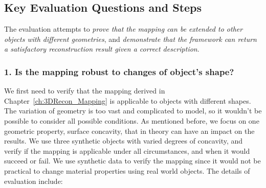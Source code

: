 

\subsection{Key Evaluation Questions and Steps}

The evaluation attempts to \textit{prove that the mapping can be extended to other objects with different geometries}, and \textit{demonstrate that the framework can return a satisfactory reconstruction result given a correct description}.

\subsubsection{1. Is the mapping robust to changes of object's shape?}
We first need to verify that the mapping derived in Chapter~\ref{ch:3DRecon_Mapping} is applicable to objects with different shapes. The variation of geometry is too vast and complicated to model, so it wouldn't be possible to consider all possible conditions. As mentioned before, we focus on one geometric property, surface concavity, that in theory can have an impact on the results. We use three synthetic objects with varied degrees of concavity, and verify if the mapping is applicable under all circumstances, and when it would succeed or fail. We use synthetic data to verify the mapping since it would not be practical to change material properties using real world objects. The details of evaluation include:


